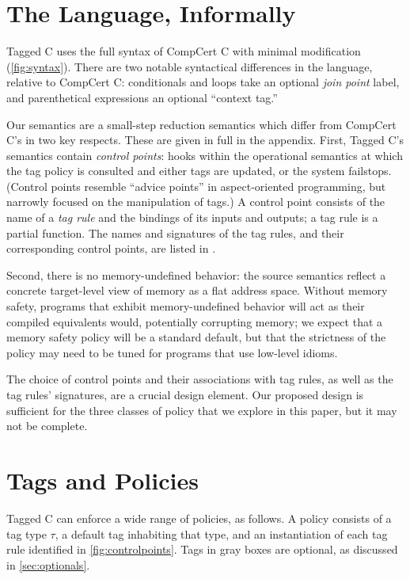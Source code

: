 \documentclass{llncs}
\begin{document}
\section{The Language, Informally}

Tagged C uses the full syntax of CompCert C \cite{Leroy09:CompCert} with minimal modification (\cref{fig:syntax}).
There are two notable syntactical differences in the language, relative to CompCert C:
conditionals and loops take an optional {\em join point} label, and parenthetical expressions
an optional ``context tag.''

Our semantics are a small-step reduction semantics which differ from CompCert C's in
two key respects. These are given in full in the appendix. First, Tagged C's semantics contain
{\em control points}: hooks within the
operational semantics at which the tag policy is consulted and either tags are updated, or the system
failstops. (Control points resemble ``advice points'' in aspect-oriented programming, but narrowly
focused on the manipulation of tags.) A control point consists of the name of a {\em tag rule}
and the bindings of its inputs and outputs; a tag rule is a partial function. The names and
signatures of the tag rules, and their corresponding control points, are listed in .

Second, there is no memory-undefined behavior: the source semantics reflect a
concrete target-level view of memory as a flat address space. Without memory safety, programs
that exhibit memory-undefined behavior will act as their compiled equivalents would, potentially
corrupting memory; we expect that a memory safety policy will be a standard default, but that the
strictness of the policy may need to be tuned for programs that use low-level idioms.

The choice of control points and their associations with tag rules, as well as the tag rules'
signatures, are a crucial design element. Our proposed design is sufficient for the three classes of
policy that we explore in this paper, but it may not be complete.

\section{Tags and Policies}
\label{sec:policies}

Tagged C can enforce a wide range of policies, as follows.
A policy consists of a tag type \(\tau\), a default tag inhabiting that type, and an instantiation
of each tag rule identified in \cref{fig:controlpoints}. Tags in gray boxes are optional, as discussed
in \cref{sec:optionals}.
\end{document}

